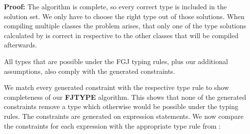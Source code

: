 \documentclass[a4paper,USenglish,cleveref, autoref, thm-restate]{lipics-v2021}
\begin{document}
\begin{theoremAndi}

\end{theoremAndi}
\textbf{Proof:} The \unify{} algorithm is complete, so every correct type is included in the solution set.
We only have to choose the right type out of those solutions.
When compiling multiple classes the problem arises,
that only one of the type solutions calculated by \unify{} is correct
in respective to the other classes that will be compiled afterwards.

All types that are possible under the FGJ typing rules, plus our additional assumptions,
also comply with the generated constraints.

We match every generated constraint with the respective type rule to show completeness of our \textbf{FJTYPE} algorithm.
This shows that none of the generated constraints remove a type which otherwise would be possible under the \TFGJ typing rules.
The constraints are generated on expression statements.
We now compare the constraints for each expression with the appropriate type rule from \TFGJ:
\end{document}
